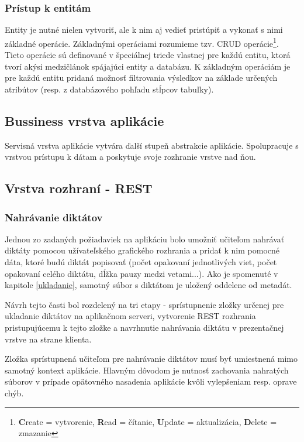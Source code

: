 \documentclass[12pt,oneside]{fithesis2}
\begin{document}
	\subsubsection{Prístup k entitám}
	\par Entity je nutné nielen vytvoriť, ale k nim aj vedieť pristúpiť a vykonať s nimi základné operácie. Základnými operáciami rozumieme tzv. CRUD operácie\footnote{\textbf{C}reate = vytvorenie, \textbf{R}ead = čítanie, \textbf{U}pdate = aktualizácia, \textbf{D}elete = zmazanie}. Tieto operácie sú definované v špeciálnej triede vlastnej pre každú entitu, ktorá tvorí akýsi medzičlánok spájajúci entity a databázu. K základným operáciám je pre každú entitu pridaná možnosť filtrovania výsledkov na základe určených atribútov (resp. z databázového pohľadu stĺpcov tabuľky).
      \subsection{Bussiness vrstva aplikácie}
      
      \par Servisná vrstva aplikácie vytvára ďalší stupeň abstrakcie aplikácie. Spolupracuje s vrstvou prístupu k dátam a poskytuje svoje rozhranie vrstve nad ňou.
      \subsection{Vrstva rozhraní - REST}
         \subsubsection{Nahrávanie diktátov}
   \par Jednou zo zadaných požiadaviek na aplikáciu bolo umožniť učiteľom nahrávať diktáty pomocou užívateľského grafického rozhrania a pridať k nim pomocné dáta, ktoré budú diktát popisovať (počet opakovaní jednotlivých viet, počet opakovaní celého diktátu, dĺžka pauzy medzi vetami...). Ako je spomenuté v kapitole \ref{ukladanie}, samotný súbor s diktátom je uložený oddelene od metadát.
   \par Návrh tejto časti bol rozdelený na tri etapy - sprístupnenie zložky určenej pre ukladanie diktátov na aplikačnom serveri, vytvorenie REST rozhrania pristupujúcemu k tejto zložke a navrhnutie nahrávania diktátu v prezentačnej vrstve na strane klienta.
   \par Zložka sprístupnená učiteľom pre nahrávanie diktátov musí byť umiestnená mimo samotný kontext aplikácie. Hlavným dôvodom je nutnosť zachovania nahratých súborov v prípade opätovného nasadenia aplikácie kvôli vylepšeniam resp. oprave chýb.
\end{document}

